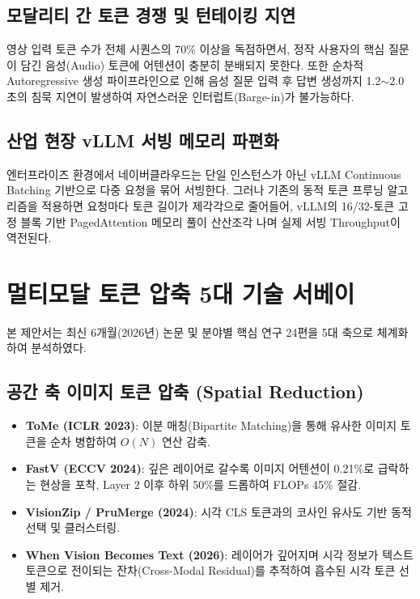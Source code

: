 \documentclass[10pt, a4paper, twocolumn]{article}
\begin{document}
\subsection{모달리티 간 토큰 경쟁 및 턴테이킹 지연}
영상 입력 토큰 수가 전체 시퀀스의 70\% 이상을 독점하면서, 정작 사용자의 핵심 질문이 담긴 음성(Audio) 토큰에 어텐션이 충분히 분배되지 못한다. 또한 순차적 Autoregressive 생성 파이프라인으로 인해 음성 질문 입력 후 답변 생성까지 1.2$\sim$2.0초의 침묵 지연이 발생하여 자연스러운 인터럽트(Barge-in)가 불가능하다.

\subsection{산업 현장 vLLM 서빙 메모리 파편화}
엔터프라이즈 환경에서 네이버클라우드는 단일 인스턴스가 아닌 vLLM Continuous Batching 기반으로 다중 요청을 묶어 서빙한다. 그러나 기존의 동적 토큰 프루닝 알고리즘을 적용하면 요청마다 토큰 길이가 제각각으로 줄어들어, vLLM의 16/32-토큰 고정 블록 기반 PagedAttention 메모리 풀이 산산조각 나며 실제 서빙 Throughput이 역전된다.

\section{멀티모달 토큰 압축 5대 기술 서베이}
본 제안서는 최신 6개월(2026년) 논문 및 분야별 핵심 연구 24편을 5대 축으로 체계화하여 분석하였다.

\subsection{공간 축 이미지 토큰 압축 (Spatial Reduction)}
\begin{itemize}
    \item \textbf{ToMe (ICLR 2023)}: 이분 매칭(Bipartite Matching)을 통해 유사한 이미지 토큰을 순차 병합하여 $O(N)$ 연산 감축.
    \item \textbf{FastV (ECCV 2024)}: 깊은 레이어로 갈수록 이미지 어텐션이 0.21\%로 급락하는 현상을 포착, Layer 2 이후 하위 50\%를 드롭하여 FLOPs 45\% 절감.
    \item \textbf{VisionZip / PruMerge (2024)}: 시각 CLS 토큰과의 코사인 유사도 기반 동적 선택 및 클러스터링.
    \item \textbf{When Vision Becomes Text (2026)}: 레이어가 깊어지며 시각 정보가 텍스트 토큰으로 전이되는 잔차(Cross-Modal Residual)를 추적하여 흡수된 시각 토큰 선별 제거.
\end{itemize}
\end{document}
